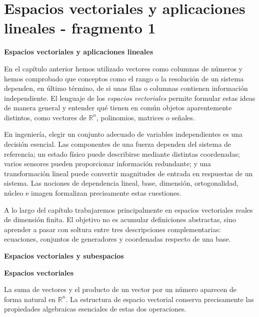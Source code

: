 
\section{Espacios vectoriales y aplicaciones lineales - fragmento 1}
\textbf{Espacios vectoriales y aplicaciones lineales}

En el capítulo anterior hemos utilizado vectores como columnas de números y hemos comprobado que conceptos como el rango o la resolución de un sistema dependen, en último término, de si unas filas o columnas contienen información independiente. El lenguaje de los \emph{espacios vectoriales} permite formular estas ideas de manera general y entender qué tienen en común objetos aparentemente distintos, como vectores de $\mathbb{R}^n$, polinomios, matrices o señales.

En ingeniería, elegir un conjunto adecuado de variables independientes es una decisión esencial. Las componentes de una fuerza dependen del sistema de referencia; un estado físico puede describirse mediante distintas coordenadas; varios sensores pueden proporcionar información redundante; y una transformación lineal puede convertir magnitudes de entrada en respuestas de un sistema. Las nociones de dependencia lineal, base, dimensión, ortogonalidad, núcleo e imagen formalizan precisamente estas cuestiones.

A lo largo del capítulo trabajaremos principalmente en espacios vectoriales reales de dimensión finita. El objetivo no es acumular definiciones abstractas, sino aprender a pasar con soltura entre tres descripciones complementarias: ecuaciones, conjuntos de generadores y coordenadas respecto de una base.

\textbf{Espacios vectoriales y subespacios}

\textbf{Espacios vectoriales}

La suma de vectores y el producto de un vector por un número aparecen de forma natural en $\mathbb{R}^n$. La estructura de espacio vectorial conserva precisamente las propiedades algebraicas esenciales de estas dos operaciones.


